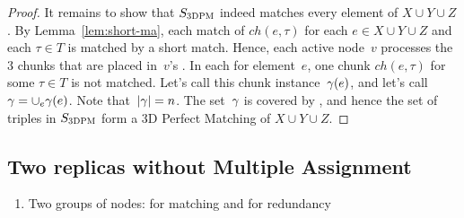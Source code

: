 \begin{proof}
  It remains to show that $S_{\textsc{3DPM}}$ indeed matches every element of $X\cup Y\cup Z$.
  By Lemma~\ref{lem:short-ma}, each match of $ch(e, \tau)$ for each $e\in X\cup Y\cup Z$ and each $\tau \in T$ is matched by a short match.
  Hence, each active node~$v$ processes the 3 chunks that are placed in~$v$'s \TripleGadget.
  In each {\ElGadget} for element~$e$, one chunk $ch(e, \tau)$ for some $\tau \in T$ is not matched.
  Let's call this chunk instance~$\gamma(e)$, and let's call~$\gamma = \cup_e \gamma(e)$.
  Note that~$|\gamma| = n$.
  The set~$\gamma$ is covered by \ActiveNodes{}, and hence the set of triples in $S_{\textsc{3DPM}}$ form a 3D Perfect Matching of $X\cup Y\cup Z$.
\end{proof}










\subsection{Two replicas without Multiple Assignment}\label{ap:tworep-ni}

\begin{enumerate}
  \item Two groups of nodes: for matching and for redundancy
\end{enumerate}